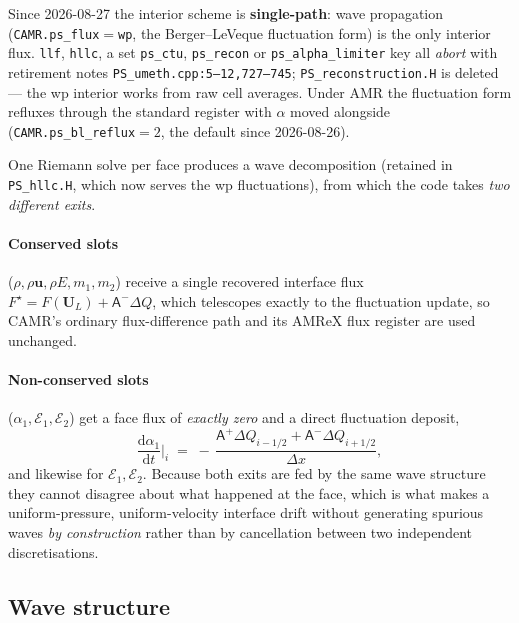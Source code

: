 \documentclass[11pt,a4paper]{article}
\newcommand{\uvec}{\mathbf{u}}
\newcommand{\code}[1]{\texttt{\small #1}}
\newcommand{\src}[1]{{\color{gray}\code{#1}}}
\begin{document}
Since 2026-08-27 the interior scheme is \textbf{single-path}: wave
propagation (\code{CAMR.ps\_flux}$=$\code{wp}, the Berger--LeVeque
fluctuation form) is the only interior flux.  \code{llf}, \code{hllc}, a
set \code{ps\_ctu}, \code{ps\_recon} or \code{ps\_alpha\_limiter} key all
\emph{abort} with retirement notes \src{PS\_umeth.cpp:5--12,727--745};
\code{PS\_reconstruction.H} is deleted --- the wp interior works from raw
cell averages.  Under AMR the fluctuation form refluxes through the
standard register with $\alpha$ moved alongside
(\code{CAMR.ps\_bl\_reflux}$=2$, the default since 2026-08-26).

One Riemann solve per face produces a wave decomposition (retained in
\code{PS\_hllc.H}, which now serves the wp fluctuations), from which the
code takes \emph{two different exits}.

\paragraph{Conserved slots} ($\rho,\rho\uvec,\rho E,m_1,m_2$) receive a single
recovered interface flux $F^\star = F(\mathbf{U}_L) + \mathsf{A}^-\Delta Q$,
which telescopes exactly to the fluctuation update, so CAMR's ordinary
flux-difference path and its AMReX flux register are used unchanged.

\paragraph{Non-conserved slots} ($\alpha_1,\mathcal{E}_1,\mathcal{E}_2$) get a
face flux of \emph{exactly zero} and a direct fluctuation deposit,
\begin{equation}
  \frac{\mathrm{d}\alpha_1}{\mathrm{d}t}\Big|_i
   \;=\;-\,\frac{\mathsf{A}^+\Delta Q_{i-1/2}
                + \mathsf{A}^-\Delta Q_{i+1/2}}{\Delta x},
\end{equation}
and likewise for $\mathcal{E}_1,\mathcal{E}_2$.  Because both exits are fed by
the same wave structure they cannot disagree about what happened at the face,
which is what makes a uniform-pressure, uniform-velocity interface drift
without generating spurious waves \emph{by construction} rather than by
cancellation between two independent discretisations.

\subsection{Wave structure}
\end{document}
